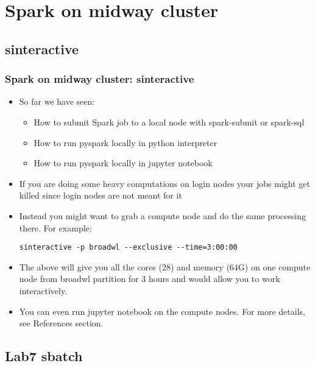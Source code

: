 \section{Spark on midway cluster}
\subsection{sinteractive}
\begin{frame}[fragile]
  \frametitle{Spark on midway cluster: sinteractive}
  \begin{itemize}
  \item So far we have seen:
    \begin{itemize}
    \item How to submit Spark job to a local node with {\color{mycolorcli}spark-submit} or {\color{mycolorcli}spark-sql}
    \item How to run pyspark locally in python interpreter
    \item How to run pyspark locally in jupyter notebook
    \end{itemize}
  \item If you are doing some heavy computations on login nodes your jobs might get killed since login nodes are not meant for it
  \item Instead you might want to grab a compute node and do the same processing there. For example:
    {\color{mycolorcli}
\begin{verbatim}
sinteractive -p broadwl --exclusive --time=3:00:00
\end{verbatim}
    }
  \item The above will give you all the cores (28) and memory (64G) on one compute node from broadwl partition for 3 hours and would allow you to work interactively.
  \item You can even run jupyter notebook on the compute nodes. For more details, see References section.
\end{itemize}
\end{frame}

\subsection{Lab7 sbatch}

